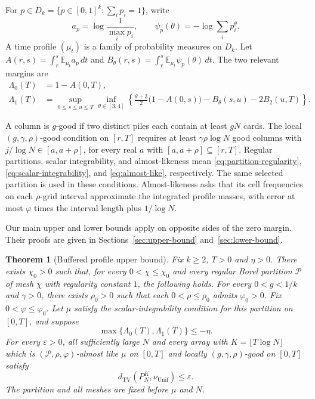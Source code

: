 \documentclass[11pt]{article}
\numberwithin{equation}{section}
\newtheorem{theorem}{Theorem}[section]
\theoremstyle{definition}
\theoremstyle{remark}
\newcommand{\E}{\mathbb E}
\newcommand{\TV}{\mathrm{TV}}
\newcommand{\Unif}{\mathrm{Unif}}
\newcommand{\dTV}{d_{\TV}}
\newcommand{\nuUnif}{\nu_{\Unif}}
\newcommand{\1}{\mathbf 1}
\begin{document}
For $p\in D_k=\{p\in[0,1]^k:\sum_i p_i=1\}$, write
\[
 a_p=\log\frac1{\max_i p_i},\qquad
 \psi_p(\theta)=-\log\sum_i p_i^\theta.
\]
A time profile $(\mu_t)$ is a family of probability measures on $D_k$.
Let $A(r,s)=\int_r^s\E_{\mu_t}a_p\,dt$ and
$B_\theta(r,s)=\int_r^s\E_{\mu_t}\psi_p(\theta)\,dt$.
The two relevant margins are
\begin{align*}
 \Lambda_0(T)&=1-A(0,T),\\
 \Lambda_1(T)&=\sup_{0\le s\le u\le T}\inf_{\theta\in[3,4]}
 \left\{\frac{\theta+3}{2}\bigl(1-A(0,s)\bigr)
       -B_\theta(s,u)-2B_2(u,T)\right\}.
\end{align*}

A column is $g$-good if two distinct piles each contain at least
$gN$ cards. The local $(g,\gamma,\rho)$-good condition on $[r,T]$
requires at least $\gamma\rho\log N$ good columns with
$j/\log N\in[a,a+\rho]$, for every real $a$ with
$[a,a+\rho]\subseteq[r,T]$.
Regular partitions, scalar integrability, and almost-likeness mean
\eqref{eq:partition-regularity}, \eqref{eq:scalar-integrability}, and
\eqref{eq:almost-like}, respectively. The same selected partition is
used in these conditions. Almost-likeness asks that its cell frequencies
on each $\rho$-grid interval approximate the integrated profile masses,
with error at most $\varphi$ times the interval length plus $1/\log N$.

Our main upper and lower bounds apply on opposite sides of the zero
margin. Their proofs are given in Sections~\ref{sec:upper-bound}
and~\ref{sec:lower-bound}.

\begin{theorem}[Buffered profile upper bound]\label{thm:upper-profile}
Fix $k\ge2$, $T>0$ and $\eta>0$. There exists $\chi_0>0$ such that,
for every $0<\chi\le\chi_0$ and every regular Borel partition $\mathcal P$ of
mesh $\chi$ with regularity constant $1$, the following holds.
For every $0<g<1/k$ and $\gamma>0$, there exists $\rho_0>0$ such
that each $0<\rho\le\rho_0$ admits $\varphi_0>0$. Fix
$0<\varphi\le\varphi_0$. Let $\mu$ satisfy the scalar-integrability
condition for this partition on $[0,T]$, and suppose
\[
 \max\{\Lambda_0(T),\Lambda_1(T)\}\le-\eta.
\]
For every $\varepsilon>0$, all sufficiently large $N$ and every array
with $K=\lfloor T\log N\rfloor$ which is
$(\mathcal P,\rho,\varphi)$-almost like $\mu$ on $[0,T]$ and locally
$(g,\gamma,\rho)$-good on $[0,T]$ satisfy
\[
 \dTV(P_N^K,\nuUnif)\le\varepsilon.
\]
The partition and all meshes are fixed before $\mu$ and $N$.
\end{theorem}
\end{document}
